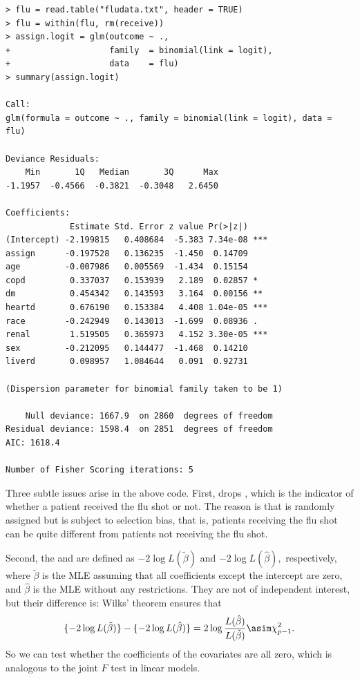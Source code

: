 \begin{lstlisting}
> flu = read.table("fludata.txt", header = TRUE)
> flu = within(flu, rm(receive))
> assign.logit = glm(outcome ~ ., 
+                    family  = binomial(link = logit), 
+                    data    = flu)
> summary(assign.logit)

Call:
glm(formula = outcome ~ ., family = binomial(link = logit), data = flu)

Deviance Residuals: 
    Min       1Q   Median       3Q      Max  
-1.1957  -0.4566  -0.3821  -0.3048   2.6450  

Coefficients:
             Estimate Std. Error z value Pr(>|z|)    
(Intercept) -2.199815   0.408684  -5.383 7.34e-08 ***
assign      -0.197528   0.136235  -1.450  0.14709    
age         -0.007986   0.005569  -1.434  0.15154    
copd         0.337037   0.153939   2.189  0.02857 *  
dm           0.454342   0.143593   3.164  0.00156 ** 
heartd       0.676190   0.153384   4.408 1.04e-05 ***
race        -0.242949   0.143013  -1.699  0.08936 .  
renal        1.519505   0.365973   4.152 3.30e-05 ***
sex         -0.212095   0.144477  -1.468  0.14210    
liverd       0.098957   1.084644   0.091  0.92731    

(Dispersion parameter for binomial family taken to be 1)

    Null deviance: 1667.9  on 2860  degrees of freedom
Residual deviance: 1598.4  on 2851  degrees of freedom
AIC: 1618.4

Number of Fisher Scoring iterations: 5
\end{lstlisting}



Three subtle issues arise in the above code. First,  drops , which is the indicator of whether a patient received the flu shot or not. The reason is that   is randomly assigned but  is subject to selection bias, that is, patients receiving the flu shot can be quite different from patients not receiving the flu shot.



Second, the  and  are defined as 
$
- 2 \log L(\tilde{\beta})
$
and
$
- 2 \log L(\hat{\beta}),
$
 respectively, where $\tilde{\beta}$ is the MLE assuming that all coefficients except the intercept are zero, and $\hat{\beta}$ is the MLE without any restrictions. They are not of independent interest, but their difference is: Wilks' theorem ensures that
 $$
 \{ - 2 \log L(\tilde{\beta}) \}  - \{- 2 \log L(\hat{\beta})\}
 =2 \log \frac{ L(\hat{\beta})  }{ L(\tilde{\beta}) } \asim \chi_{p-1}^2.
 $$
So we can test whether the coefficients of the covariates are all zero, which is analogous to the joint $F$ test in linear models. 


